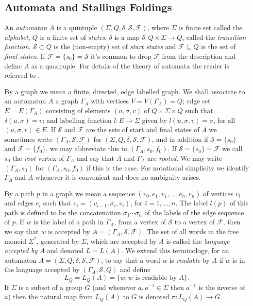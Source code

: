 \documentclass[a4paper,12pt]{article}
\newcommand{\G}{\Gamma }
\renewcommand{\d}{\delta }
\newcommand{\s}{\sigma }
\renewcommand{\S}{\Sigma }
\newcommand{\cF}{{\cal{F}}}
\newcommand{\cS}{{\cal{S}}}
\numberwithin{equation}{section}
\numberwithin{figure}{section}
\renewcommand{\cF}{\mathcal{F}}
\renewcommand{\cS}{\mathcal{S}}
\newcommand{\maps}{\rightarrow}
\begin{document}
\subsection{Automata and Stallings Foldings}\label{sub:foldings}

An {\em automaton} $A$ is  a quintuple
$(\S,Q,\d,\mathcal{S},\mathcal{F})$, where $\S$ is finite set
called the {\em alphabet}, $Q$ is a finite set of {\em states},
$\d$ is a map $\d:Q\times \S\maps Q$, called the {\em transition
function}, $\mathcal{S}\subset Q$ is the (non-empty) set of {\em
start states} and $\mathcal{F}\subseteq Q$ is the set of {\em
final states}.  If
$\mathcal{F}=\{s_0\}=\mathcal{S}$ it's common to drop
$\mathcal{F}$ from the description and define $A$ as a quadruple.
For details of the theory of automata the reader is referred to
 \cite{Lawson04}.

By a graph we mean a finite, directed, edge labelled graph.
We shall associate to an automaton $A$
a graph $\G_A$ with vertices
$V=V(\G_A)=Q$; edge set $E=E(\G_A)$ consisting of elements
$(u,\s,v)$ of $Q\times \S\times Q$ such that $\d(u,\s)=v$; and
labelling function $l:E\maps \S$ given by $l(u,\s,v)=\s$, for all
$(u,\s,v) \in E$.  If $\mathcal{S}$ and $\mathcal{F}$ are the sets
of start and final states of $A$ we sometimes write
$(\G_A,\mathcal{S},\mathcal{F})$ for
$(\S,Q,\d,\mathcal{S},\mathcal{F})$, and in addition if
$\mathcal{S}=\{s_0\}$ and $\mathcal{F}=\{f_0\}$, we may abbreviate
this to $(\G_A,s_0,f_0)$. If $\mathcal{S}=\{s_0\}=\mathcal{F}$
we
call $s_0$ the {\em root}
vertex of $\G_A$ and say that $A$ and $\G_A$ are {\em rooted}. We may
 write $(\G_A,s_0)$ for $(\G_A,s_0,f_0)$ if this is the case.  
For notational simplicity we identify $\G_A$
and $A$ whenever it is convenient and does no ambiguity arises.

By a path $p$
in a graph we mean a sequence $(v_0,e_1,v_1, \ldots , e_n ,v_n)$ of
 vertices $v_i$ and edges $e_i$ such that
 $e_i=(v_{i-1},\s_i,v_i)$, for $i=1,\ldots ,n$.
The
label $l(p)$ of this  path is defined to be
 the concatenation $\s_1\cdots \s_n$ of the labels of the
edge sequence of $p$.  If $w$ is the label of a path
in $\G_A$, from a vertex of $\cS$ to a vertex of $\cF$, then we
say that $w$ is accepted by $A=(\G_A,\cS,\cF)$. The set of all
words in the free monoid $\S^*$, generated by $\S$, which are
accepted by $A$  is called
the {\em language accepted by} $A$ and denoted $L=L(A)$.
We extend this terminology, for an automaton
$A=(\S,Q,\d,\mathcal{S},\mathcal{F})$,
to say that a  word $w$ is {\em readable}
by $A$ if $w$ is in the
language accepted by $(\G_A,\cS,Q)$  and define
\[L_Q=L_Q(A)=\{w:w \textrm{ is readable by } A\}.\]
If $\S$ is a
subset of a group $G$ (and whenever $a,a^{-1}\in \S$ then $a^{-1}$ is
the inverse of $a$)
 then the  natural map from $L_Q(A)$ to
$G$ is denoted $\pi:L_Q(A)\maps G$.
\end{document}
